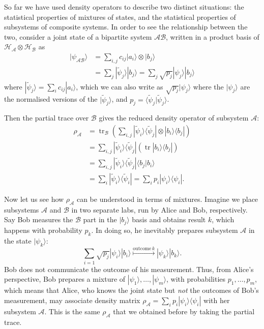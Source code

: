 \documentclass[fleqn]{article}
\begin{document}
So far we have used density operators to describe two distinct situations: the statistical properties of mixtures of states, and the statistical properties of subsystems of composite systems.
In order to see the relationship between the two, consider a joint state of a bipartite system \(\mathcal{AB}\), written in a product basis of \(\mathcal{H}_{\mathcal{A}}\otimes\mathcal{H}_{\mathcal{B}}\) as
\[
  \begin{aligned}
    |\psi_{\mathcal{AB}}\rangle
    &= \sum_{i,j} c_{ij}|a_i\rangle\otimes|b_j\rangle
  \\&= \sum_{j} |\widetilde\psi_j\rangle|b_j\rangle
    = \sum_{j} \sqrt{p_j}|\psi_j\rangle|b_j\rangle
  \end{aligned}
\]
where \(|\widetilde\psi_j\rangle = \sum_i c_{ij}|a_i\rangle\), which we can also write as \(\sqrt{p_j}|\psi_j\rangle\) where the \(|\psi_j\rangle\) are the normalised versions of the \(|\widetilde\psi_j\rangle\), and \(p_j=\langle\widetilde\psi_j|\widetilde\psi_j\rangle\).

Then the partial trace over \(\mathcal{B}\) gives the reduced density operator of subsystem \(\mathcal{A}\):
\[
  \begin{aligned}
    \rho_{\mathcal{A}}
    &=\operatorname{tr}_{\mathcal{B}} \left( \sum_{i,j} |\widetilde\psi_i\rangle\langle\widetilde\psi_j| \otimes |b_i\rangle\langle b_j| \right)
  \\&= \sum_{i,j} |\widetilde\psi_i\rangle\langle\widetilde\psi_j| (\operatorname{tr}|b_i\rangle\langle b_j|)
  \\&= \sum_{i,j} |\widetilde\psi_i\rangle\langle\widetilde\psi_j| \langle b_j|b_i\rangle
  \\&= \sum_{i} |\widetilde\psi_i\rangle\langle\widetilde\psi_i|
    = \sum_{i} p_i |\psi_i\rangle\langle\psi_i|.
  \end{aligned}
\]

Now let us see how \(\rho_{\mathcal{A}}\) can be understood in terms of mixtures.
Imagine we place subsystems \(\mathcal{A}\) and \(\mathcal{B}\) in two separate labs, run by Alice and Bob, respectively.
Say Bob measures the \(\mathcal{B}\) part in the \(|b_j\rangle\) basis and obtains result \(k\), which happens with probability \(p_k\).
In doing so, he inevitably prepares subsystem \(\mathcal{A}\) in the state \(|\psi_k\rangle\):
\[
  \sum_{i=1} \sqrt{p_j}|\psi_i\rangle|b_i\rangle
  \overset{\mathrm{outcome}\,k}{\longmapsto}
  |\psi_k\rangle|b_k\rangle.
\]
Bob does not communicate the outcome of his measurement.
Thus, from Alice's perspective, Bob prepares a mixture of \(|\psi_1\rangle,\ldots,|\psi_m\rangle\), with probabilities \(p_1,\ldots,p_m\), which means that Alice, who knows the joint state but \emph{not} the outcomes of Bob's measurement, may associate density matrix \(\rho_{\mathcal{A}}=\sum_i p_i|\psi_i\rangle\langle\psi_i|\) with her subsystem \(\mathcal{A}\).
This is the same \(\rho_{\mathcal{A}}\) that we obtained before by taking the partial trace.
\end{document}
